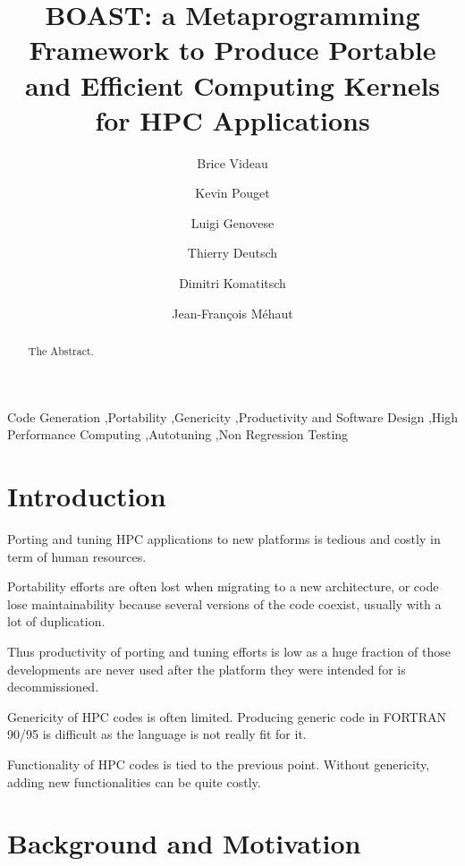 \documentclass[review]{elsarticle}
\begin{document}
\begin{frontmatter}

\title{BOAST: a Metaprogramming Framework to Produce Portable and Efficient Computing Kernels for HPC Applications}

\author[mymainaddress]{Brice Videau}
\author{Kevin Pouget}
\author{Luigi Genovese}
\author{Thierry Deutsch}
\author{Dimitri Komatitsch}
\author{Jean-François Méhaut}

\address[mymainaddress]{LIG/CNRS}

\begin{abstract}
The Abstract.
\end{abstract}

\begin{keyword}
Code Generation \sep Portability \sep Genericity \sep Productivity and Software
Design \sep High Performance Computing \sep Autotuning \sep Non Regression
Testing
\end{keyword}

\end{frontmatter}

\linenumbers

\section{Introduction}

Porting and tuning HPC applications to new platforms is tedious and costly in
term of human resources.

Portability efforts are often lost when migrating to a new architecture, or code
lose maintainability because several versions of the code coexist, usually with
a lot of duplication.

Thus productivity of porting and tuning efforts is low as a huge fraction of
those developments are never used after the platform they were intended for is
decommissioned.

Genericity of HPC codes is often limited. Producing generic code in FORTRAN
90/95 is difficult as the language is not really  fit for it.

Functionality of HPC codes is tied to the previous point. Without genericity,
adding new functionalities can be quite costly.

\section{Background and Motivation}
\end{document}
